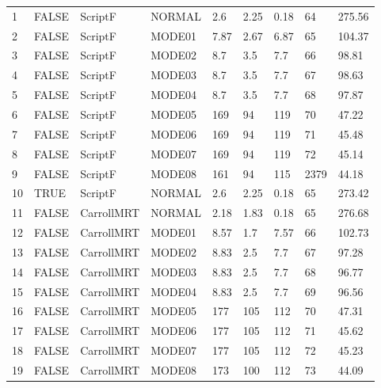 {\begin{longtable}[c]{p{0.2in}p{0.4in}p{0.55in}p{0.7in}p{0.5in}p{0.6in}p{0.7in}p{0.6in}p{0.6in}}
    1  & FALSE & ScriptF    & NORMAL & 2.6     & 2.25     & 0.18     & 64 & 275.56 \tabularnewline
    2  & FALSE & ScriptF    & MODE01 & 7.87     & 2.67     & 6.87     & 65 & 104.37  \tabularnewline
    3  & FALSE & ScriptF    & MODE02 & 8.7     & 3.5     & 7.7     & 66 & 98.81  \tabularnewline
    4  & FALSE & ScriptF    & MODE03 & 8.7     & 3.5   & 7.7     & 67 & 98.63  \tabularnewline
    5  & FALSE & ScriptF    & MODE04 & 8.7     & 3.5   & 7.7     & 68 & 97.87  \tabularnewline
    6  & FALSE & ScriptF    & MODE05 & 169     & 94     & 119     & 70 & 47.22  \tabularnewline
    7  & FALSE & ScriptF    & MODE06 & 169     & 94     & 119     & 71 & 45.48  \tabularnewline
    8  & FALSE & ScriptF    & MODE07 & 169     & 94     & 119     & 72 & 45.14  \tabularnewline
    9  & FALSE & ScriptF    & MODE08 & 161     & 94     & 115     & 2379 & 44.18 \tabularnewline
    10  & TRUE & ScriptF    & NORMAL & 2.6     & 2.25     & 0.18     & 65 & 273.42 \tabularnewline
    11 & FALSE & CarrollMRT & NORMAL & 2.18     & 1.83     & 0.18     & 65 & 276.68 \tabularnewline
    12 & FALSE & CarrollMRT & MODE01 & 8.57     & 1.7     & 7.57     & 66 & 102.73  \tabularnewline
    13 & FALSE & CarrollMRT & MODE02 & 8.83     & 2.5     & 7.7     & 67 & 97.28  \tabularnewline
    14 & FALSE & CarrollMRT & MODE03 & 8.83     & 2.5     & 7.7     & 68 & 96.77  \tabularnewline
    15 & FALSE & CarrollMRT & MODE04 & 8.83     & 2.5     & 7.7     & 69 & 96.56  \tabularnewline
    16 & FALSE & CarrollMRT & MODE05 & 177     & 105     & 112     & 70 & 47.31  \tabularnewline
    17 & FALSE & CarrollMRT & MODE06 & 177     & 105     & 112     & 71 & 45.62  \tabularnewline
    18 & FALSE & CarrollMRT & MODE07 & 177     & 105     & 112     & 72 & 45.23  \tabularnewline
    19 & FALSE & CarrollMRT & MODE08 & 173     & 100     & 112     & 73 & 44.09  \tabularnewline

    \bottomrule
\end{longtable}
}


